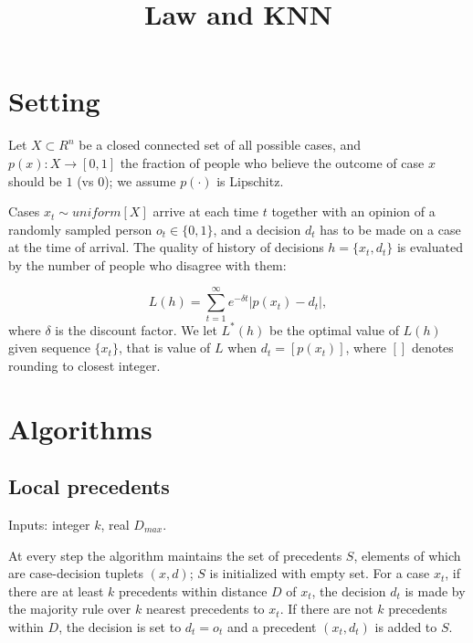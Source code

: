 \documentclass{article}
\begin{document}
\title{Law and KNN}
\date{\vspace{-5ex}}
\maketitle



\section{Setting}

Let $X\subset R^n$ be a closed connected set of all possible cases, and $p(x): X\rightarrow [0,1]$ the fraction of people who believe the outcome of case $x$ should be $1$ (vs $0$); we assume $p(\cdot)$ is Lipschitz.

Cases $x_t\sim uniform[X]$ arrive at each time $t$ together with an opinion of a randomly sampled person $o_t\in \{0,1\}$, and a decision $d_t$ has to be made on a case at the time of arrival.  The quality of history of decisions $h = \{x_t,d_t\}$ is evaluated by the number of people who disagree with them:

$$L(h) = \sum_{t=1}^\infty e^{-\delta t}|p(x_t) -d_t|,$$
where $\delta$ is the discount factor. We let $L^*(h)$ be the optimal value of $L(h)$ given sequence $\{x_t\}$, that is value of $L$ when $d_t = [p(x_t)]$, where $[]$ denotes rounding to closest integer.

\section{Algorithms}

\subsection{Local precedents}

Inputs: integer $k$, real $D_{max}$.

At every step the algorithm maintains the set of precedents $S$, elements of which are case-decision tuplets $(x,d)$; $S$ is initialized with empty set. For a case $x_t$, if there are at least $k$ precedents within distance $D$ of $x_t$, the decision $d_t$ is made by the majority rule over $k$ nearest precedents to $x_t$. If there are not $k$ precedents within $D$, the decision is set to $d_t = o_t$ and a precedent $(x_t,d_t)$ is added to $S$.
\end{document}
